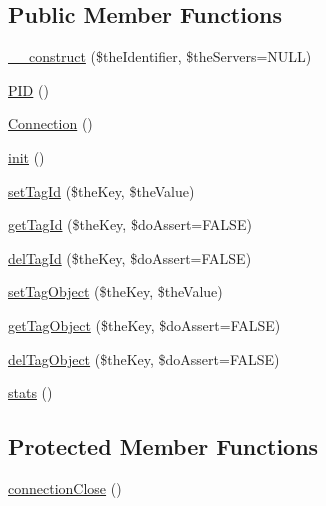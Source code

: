 \subsection*{Public Member Functions}
\begin{DoxyCompactItemize}
\item 
\hyperlink{class_ontology_wrapper_1_1_tag_cache_ac773acbec3cb36c003389286705b4338}{\-\_\-\-\_\-construct} (\$the\-Identifier, \$the\-Servers=N\-U\-L\-L)
\item 
\hyperlink{class_ontology_wrapper_1_1_tag_cache_abb702b90d228a9b7546d13c468db26fd}{P\-I\-D} ()
\item 
\hyperlink{class_ontology_wrapper_1_1_tag_cache_a205ab6592fa82d6a3265d20fda2c3721}{Connection} ()
\item 
\hyperlink{class_ontology_wrapper_1_1_tag_cache_ae64d13e0014dd859a1f44e2fa445f2a9}{init} ()
\item 
\hyperlink{class_ontology_wrapper_1_1_tag_cache_a0759bc0731624f19e60e9f8fa1d713dc}{set\-Tag\-Id} (\$the\-Key, \$the\-Value)
\item 
\hyperlink{class_ontology_wrapper_1_1_tag_cache_ae1b912d5cda8480ad9808d7a13c78e2e}{get\-Tag\-Id} (\$the\-Key, \$do\-Assert=F\-A\-L\-S\-E)
\item 
\hyperlink{class_ontology_wrapper_1_1_tag_cache_ae173d79b363c3527a20d711e2682a498}{del\-Tag\-Id} (\$the\-Key, \$do\-Assert=F\-A\-L\-S\-E)
\item 
\hyperlink{class_ontology_wrapper_1_1_tag_cache_aa40cb3a1f612fcc205e660a8397c22e4}{set\-Tag\-Object} (\$the\-Key, \$the\-Value)
\item 
\hyperlink{class_ontology_wrapper_1_1_tag_cache_a89bb41e8e92f93d4f785dd2bee347e86}{get\-Tag\-Object} (\$the\-Key, \$do\-Assert=F\-A\-L\-S\-E)
\item 
\hyperlink{class_ontology_wrapper_1_1_tag_cache_a4c7f47ee102fd5d71e6bc712ab18b90f}{del\-Tag\-Object} (\$the\-Key, \$do\-Assert=F\-A\-L\-S\-E)
\item 
\hyperlink{class_ontology_wrapper_1_1_tag_cache_aaecd49741c55d6fdb7f94d892a84f8d3}{stats} ()
\end{DoxyCompactItemize}
\subsection*{Protected Member Functions}
\begin{DoxyCompactItemize}
\item 
\hyperlink{class_ontology_wrapper_1_1_tag_cache_a02652ffd7800662d949483a478bada82}{connection\-Close} ()
\end{DoxyCompactItemize}
